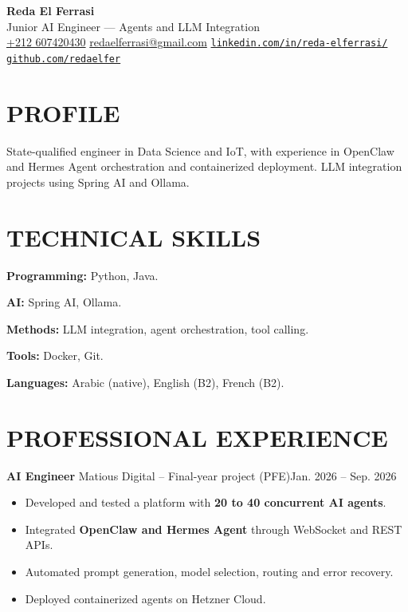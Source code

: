 \documentclass[11pt,a4paper]{article}
\newcommand{\entry}[2]{\noindent #1\hfill #2\par}
\begin{document}
\begin{center}
  {\LARGE\bfseries Reda El Ferrasi}\\[3pt]
  {\large Junior AI Engineer --- Agents and LLM Integration}\\[5pt]
  {\small
    \href{tel:+212607420430}{+212 607420430}
    \enspace\textbar{}\enspace
    \href{mailto:redaelferrasi@gmail.com}{redaelferrasi@gmail.com}
    \enspace\textbar{}\enspace
    \href{https://www.linkedin.com/in/reda-elferrasi/}{\nolinkurl{linkedin.com/in/reda-elferrasi/}}
    \enspace\textbar{}\enspace
    \href{https://github.com/redaelfer}{\nolinkurl{github.com/redaelfer}}
  }
\end{center}
\vspace{-5pt}


\section*{PROFILE}
State-qualified engineer in Data Science and IoT, with experience in OpenClaw and Hermes Agent orchestration and containerized deployment. LLM integration projects using Spring AI and Ollama.

\section*{TECHNICAL SKILLS}
\textbf{Programming:} Python, Java.\par
\textbf{AI:} Spring AI, Ollama.\par
\textbf{Methods:} LLM integration, agent orchestration, tool calling.\par
\textbf{Tools:} Docker, Git.\par
\textbf{Languages:} Arabic (native), English (B2), French (B2).

\section*{PROFESSIONAL EXPERIENCE}

\entry{\textbf{AI Engineer} \textbar{} Matious Digital -- Final-year project (PFE)}{Jan. 2026 -- Sep. 2026}
\begin{itemize}
  \item Developed and tested a platform with \textbf{20 to 40 concurrent AI agents}.
  \item Integrated \textbf{OpenClaw and Hermes Agent} through WebSocket and REST APIs.
  \item Automated prompt generation, model selection, routing and error recovery.
  \item Deployed containerized agents on Hetzner Cloud.
\end{itemize}
\end{document}
